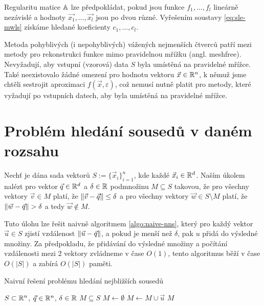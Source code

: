 Regularitu matice $\mathbb{A}$ lze předpokládat, pokud jsou funkce $f_1, \ldots, f_l$ lineárně nezávislé a hodnoty $\vec{x_1}, \ldots, \vec{x_l}$ jsou po dvou různé. Vyřešením soustavy \ref{eq:sle-mwls} získáme hledané koeficienty $c_1, \ldots, c_l$.

Metoda pohyblivých (i nepohyblivých) vážených nejmenších čtverců patří mezi metody pro rekonstrukci funkce mimo pravidelnou mřížku (angl. meshfree). Nevyžadují, aby vstupní (vzorová) data $S$ byla umístěná na pravidelné mřížce. Také neexistovalo žádné omezení pro hodnotu vektoru $\vec{x} \in \mathbb{R}^n$, k němuž jsme chtěli sestrojit aproximaci $f(\vec{x}, \varepsilon)$, což nemusí nutně platit pro metody, které vyžadují po vstupních datech, aby byla umístěná na pravidelné mřížce.

\section{Problém hledání sousedů v daném rozsahu}

\begin{defi}
  \label{defi:nns}
  Nechť je dána sada vektorů $S := \{\vec{x}_i\}_{i = 1}^n$, kde každé $\vec{x}_i \in \mathbb{R}^d$. Naším úkolem nalézt pro vektor $\vec{q} \in \mathbb{R}^d$ a $\delta \in \mathbb{R}$ podmnožinu $M \subseteq S$ takovou, že pro všechny vektory $\vec{v} \in M$ platí, že $\|\vec{v} - \vec{q}\| \leq \delta$ a pro všechny vektory $\vec{w} \in S \setminus M$ platí, že $\|\vec{w} - \vec{q}\| > \delta$ a tedy $\vec{w} \not\in M$.
\end{defi}

Tuto úlohu lze řešit naivně algoritmem \ref{algo:naive-nns}, který pro každý vektor $\vec{u} \in S$ zjistí vzdálenost $\|\vec{u} - \vec{q}\|$, a pokud je menší než $\delta$, pak $u$ přidá do výsledné množiny. Za předpokladu, že přidávání do výsledné množiny a počítání vzdálenosti mezi 2 vektory zvládneme v čase $O(1)$, tento algoritmus běží v čase $O(|S|)$ a zabírá $O(|S|)$ paměti.

\begin{algorithm}[ht!]
  \caption{Naivní řešení problému hledání nejbližších sousedů}
  \label{algo:naive-nns}
  \begin{algorithmic}
    \Require $S \subset \mathbb{R}^n$, $\vec{q} \in \mathbb{R}^n$, $\delta \in \mathbb{R}$
    \Ensure $M \subseteq S$
      \State $M \leftarrow \emptyset$
            \State $M \leftarrow M \cup \vec{u}$
          \EndIf
      \EndFor
    \State \Return $M$
    \EndProcedure
  \end{algorithmic}
\end{algorithm}

